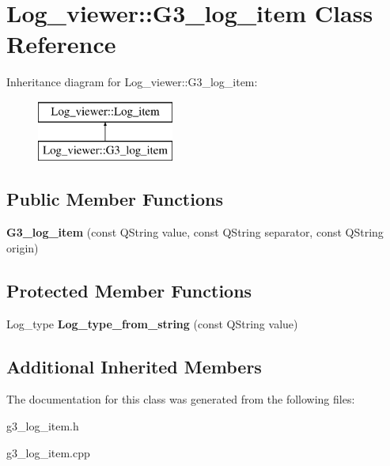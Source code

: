 \hypertarget{class_log__viewer_1_1_g3__log__item}{\section{Log\-\_\-viewer\-:\-:G3\-\_\-log\-\_\-item Class Reference}
\label{class_log__viewer_1_1_g3__log__item}
}
Inheritance diagram for Log\-\_\-viewer\-:\-:G3\-\_\-log\-\_\-item\-:\begin{figure}[H]
\begin{center}
\leavevmode
\includegraphics[height=2.000000cm]{class_log__viewer_1_1_g3__log__item}
\end{center}
\end{figure}
\subsection*{Public Member Functions}
\begin{DoxyCompactItemize}
\item 
\hypertarget{class_log__viewer_1_1_g3__log__item_a34273418bea558fe09c562f6281c9fa8}{{\bfseries G3\-\_\-log\-\_\-item} (const Q\-String value, const Q\-String separator, const Q\-String origin)}\label{class_log__viewer_1_1_g3__log__item_a34273418bea558fe09c562f6281c9fa8}

\end{DoxyCompactItemize}
\subsection*{Protected Member Functions}
\begin{DoxyCompactItemize}
\item 
\hypertarget{class_log__viewer_1_1_g3__log__item_a9c65db50792d1b5100de75f8ca72d3cf}{Log\-\_\-type {\bfseries Log\-\_\-type\-\_\-from\-\_\-string} (const Q\-String value)}\label{class_log__viewer_1_1_g3__log__item_a9c65db50792d1b5100de75f8ca72d3cf}

\end{DoxyCompactItemize}
\subsection*{Additional Inherited Members}


The documentation for this class was generated from the following files\-:\begin{DoxyCompactItemize}
\item 
g3\-\_\-log\-\_\-item.\-h\item 
g3\-\_\-log\-\_\-item.\-cpp\end{DoxyCompactItemize}
